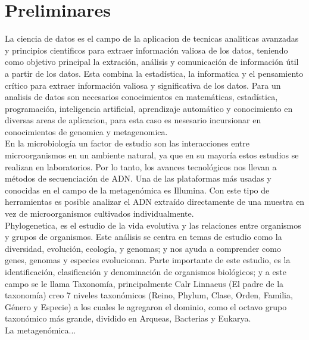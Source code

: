 \chapter{Preliminares}

La ciencia de datos es el campo de la aplicacion de tecnicas analiticas avanzadas y principios cientificos para extraer información valiosa de los datos,  teniendo como objetivo principal la extración, análisis y comunicación de información útil a partir de los datos. Esta combina la estadística, la informatica y el pensamiento crítico para extraer información valiosa y significativa de los datos. Para un analisis de datos son necesarios conocimientos en matemáticas, estadística, programación, inteligencia artificial, aprendizaje automático y conocimiento en diversas areas de aplicacion, para esta caso es nesesario incursionar en conocimientos de genomica y metagenomica.\\

En la microbiología un factor de estudio son las interacciones entre microorganismos en un ambiente natural, ya que en su mayoría estos estudios se realizan en laboratorios. Por lo tanto, los avances tecnológicos nos llevan a métodos de secuenciación de ADN. Una de las plataformas más usadas y conocidas en el campo de la metagenómica es Illumina. Con este tipo de herramientas es posible analizar el ADN extraído directamente de una muestra en vez de microorganismos cultivados individualmente. \\

Phylogenetica, es el estudio de la vida evolutiva y las relaciones entre organismos y grupos de organismos. Este análisis se centra en temas de estudio como la diversidad, evolución, ecología, y genomas; y nos ayuda a comprender como genes, genomas y especies evolucionan. Parte importante de este estudio, es la identificación, clasificación y denominación de organismos biológicos; y a este campo se le llama Taxonomía,  principalmente Calr Linnaeus (El padre de la taxonomía) creo 7 niveles taxonómicos (Reino, Phylum, Clase, Orden, Familia, Género y Especie) a los cuales le agregaron el dominio, como el octavo grupo taxonómico más grande, dividido en Arqueas, Bacterias y Eukarya. \\

La metagenómica...\\

